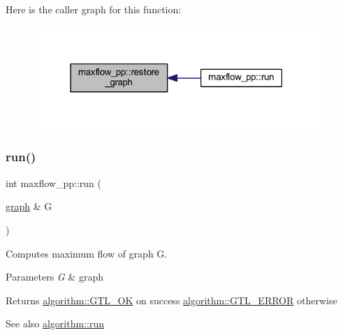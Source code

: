 Here is the caller graph for this function\+:\nopagebreak
\begin{figure}[H]
\begin{center}
\leavevmode
\includegraphics[width=307pt]{classmaxflow__pp_a273cc9bde3aeb47c08223da7458ed29d_icgraph}
\end{center}
\end{figure}
\mbox{\label{classmaxflow__pp_a07c7cb1ae5db23d87cf49ce7769b2814}} 
\subsubsection{\texorpdfstring{run()}{run()}}
{\footnotesize\ttfamily int maxflow\+\_\+pp\+::run (\begin{DoxyParamCaption}\item[{\mbox{\hyperlink{classgraph}{graph}} \&}]{G }\end{DoxyParamCaption})\hspace{0.3cm}{\ttfamily [virtual]}}

Computes maximum flow of graph {\ttfamily G}.


\begin{DoxyParams}{Parameters}
{\em G} & graph \\
\hline
\end{DoxyParams}
\begin{DoxyReturn}{Returns}
{\ttfamily \mbox{\hyperlink{classalgorithm_af1a0078e153aa99c24f9bdf0d97f6710a5114c20e4a96a76b5de9f28bf15e282b}{algorithm\+::\+G\+T\+L\+\_\+\+OK}}} on success {\ttfamily \mbox{\hyperlink{classalgorithm_af1a0078e153aa99c24f9bdf0d97f6710a6fcf574690bbd6cf710837a169510dd7}{algorithm\+::\+G\+T\+L\+\_\+\+E\+R\+R\+OR}}} otherwise 
\end{DoxyReturn}
\begin{DoxySeeAlso}{See also}
\mbox{\hyperlink{classalgorithm_a734b189509a8d6b56b65f8ff772d43ca}{algorithm\+::run}} 
\end{DoxySeeAlso}


